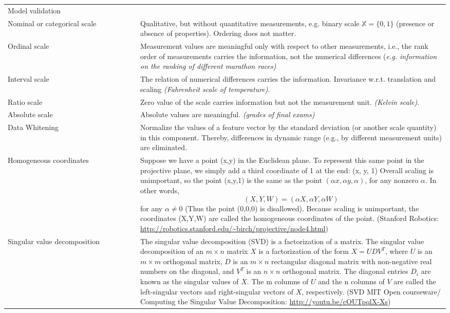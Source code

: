 \documentclass[MachineLearning]{subfiles}
\begin{document}
\begin{longtable}{p{0.3\linewidth} p{0.7\linewidth}}
Model validation & \\
Nominal or categorical scale & Qualitative, but without quantitative measurements,
e.g. binary scale \(\mathbb{X} = \{0, 1\}\) (presence or absence of
properties). Ordering does not matter.\\
Ordinal scale & Measurement values are meaningful only with respect to other measurements, i.e., the rank order of measurements carries
the information, not the numerical differences {\color{orange}(\emph{e.g. information on the ranking of different marathon races)}}\\
Interval scale &  The relation of numerical differences carries
the information. Invariance w.r.t. translation and scaling {\color{orange}\emph{(Fahrenheit scale of temperature)}}.\\
Ratio scale & Zero value of the scale carries information but not the measurement unit. {\color{orange}\emph{(Kelvin scale)}}.\\
Absolute scale & Absolute values are meaningful. {\color{orange}\emph{(grades of final exams)}}\\
Data Whitening & Normalize the values of a feature vector by the standard deviation (or another scale quantity) in this component. Thereby, differences in dynamic range (e.g., by different measurement units) are eliminated.\\
Homogeneous coordinates \label{homogenenous-coordinates@Glossary} & Suppose we have a point (x,y) in the Euclidean plane. To represent this same point in the projective plane, we simply add a third coordinate of 1 at the end: (x, y, 1) Overall scaling is unimportant, so the point (x,y,1) is the same as the point  \((\alpha x, \alpha y, \alpha)\), for any nonzero \(\alpha\). In other words, 
\[(X,Y,W) = (\alpha X, \alpha Y, \alpha W)\]
for any  $\alpha \neq 0$ (Thus the point (0,0,0) is disallowed). Because scaling is unimportant, the coordinates (X,Y,W) are called the homogeneous coordinates of the point. (Stanford Robotics: \url{http://robotics.stanford.edu/~birch/projective/node4.html})\\

Singular value decomposition \label{SVD@Glossary} &  The singular value decomposition (SVD) is a factorization of a matrix. The singular value decomposition of an \(m \times n\) matrix \(X\) is a factorization of the form \(X = UDV^T\), where \(U\) is an \(m \times m\) orthogonal matrix, \(D\) is an \(m \times n\) rectangular diagonal matrix with non-negative real numbers on the diagonal, and \(V^T\) is an \(n \times n\) orthogonal matrix. The diagonal entries \(D_i\) are known as the singular values of \(X\). The m columns of \(U\) and the n columns of \(V\) are called the left-singular vectors and right-singular vectors of \(X\), respectively. (SVD MIT Open courseware/ Computing the Singular Value Decomposition: \url{http://youtu.be/cOUTpqlX-Xs})
\end{longtable}
\end{document}

